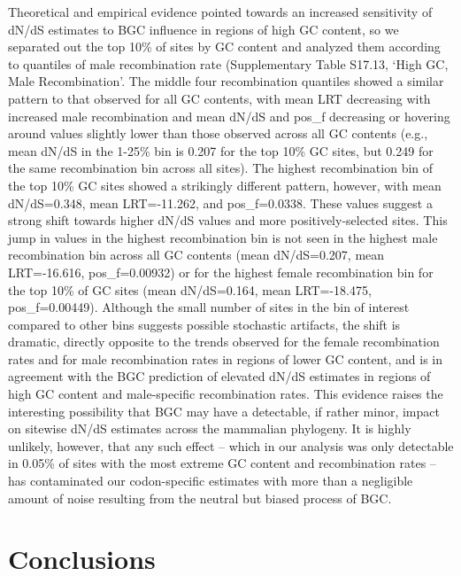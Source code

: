 Theoretical and empirical evidence pointed towards an increased
sensitivity of dN/dS estimates to BGC influence in regions of high GC
content, so we separated out the top 10\% of sites by GC content and
analyzed them according to quantiles of male recombination rate
(Supplementary Table S17.13, ‘High GC, Male Recombination’. The middle
four recombination quantiles showed a similar pattern to that observed
for all GC contents, with mean LRT decreasing with increased male
recombination and mean dN/dS and pos\_f decreasing or hovering around
values slightly lower than those observed across all GC contents
(e.g., mean dN/dS in the 1-25\% bin is 0.207 for the top 10\% GC
sites, but 0.249 for the same recombination bin across all sites). The
highest recombination bin of the top 10\% GC sites showed a strikingly
different pattern, however, with mean dN/dS=0.348, mean LRT=-11.262,
and pos\_f=0.0338. These values suggest a strong shift towards higher
dN/dS values and more positively-selected sites. This jump in values
in the highest recombination bin is not seen in the highest male
recombination bin across all GC contents (mean dN/dS=0.207, mean
LRT=-16.616, pos\_f=0.00932) or for the highest female recombination
bin for the top 10\% of GC sites (mean dN/dS=0.164, mean LRT=-18.475,
pos\_f=0.00449). Although the small number of sites in the bin of
interest compared to other bins suggests possible stochastic
artifacts, the shift is dramatic, directly opposite to the trends
observed for the female recombination rates and for male recombination
rates in regions of lower GC content, and is in agreement with the BGC
prediction of elevated dN/dS estimates in regions of high GC content
and male-specific recombination rates. This evidence raises the
interesting possibility that BGC may have a detectable, if rather
minor, impact on sitewise dN/dS estimates across the mammalian
phylogeny. It is highly unlikely, however, that any such effect --
which in our analysis was only detectable in 0.05\% of sites with the
most extreme GC content and recombination rates -- has contaminated
our codon-specific estimates with more than a negligible amount of
noise resulting from the neutral but biased process of BGC.

\section{Conclusions}


